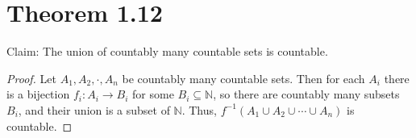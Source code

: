 \documentclass{article}
\begin{document}
\section*{Theorem 1.12} 

Claim: The union of countably many countable sets is countable.

\begin{proof}
    Let $A_1, A_2, \cdot, A_n$ be countably many countable sets.  Then for each $A_i$ there 
    is a bijection $f_i : A_i \rightarrow B_i$ for some $B_i \subseteq \mathbb{N}$, so there 
    are countably many subsets $B_i$, and their union is a subset of $\mathbb{N}$.  Thus,  
    $f^{-1}(A_1 \cup A_2 \cup \cdots \cup A_n)$ is countable.
\end{proof}
\end{document}
